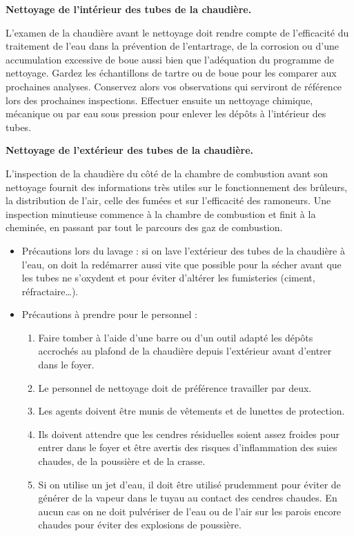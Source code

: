 \vspace{0.3cm}
\textbf{Nettoyage de l’intérieur des tubes de la chaudière.}
\vspace{0.3cm}

L’examen de la chaudière avant le nettoyage doit rendre compte de l’efficacité du traitement de l’eau dans la prévention de l’entartrage, de la corrosion ou d’une accumulation excessive de boue aussi bien que l’adéquation du programme de nettoyage. Gardez les échantillons de tartre ou de boue pour les comparer aux prochaines analyses. Conservez alors vos observations qui serviront de référence lors des prochaines inspections.
Effectuer ensuite un nettoyage chimique, mécanique ou par eau sous pression pour enlever les dépôts à l’intérieur des tubes.

\vspace{0.3cm}
\textbf{Nettoyage de l'extérieur des tubes de la chaudière.}
\vspace{0.3cm}

L’inspection de la chaudière du côté de la chambre de combustion avant son nettoyage fournit des informations très utiles sur le fonctionnement des brûleurs, la distribution de l’air, celle des fumées et sur l’efficacité des ramoneurs.
Une inspection minutieuse commence à la chambre de combustion et finit à la cheminée, en passant par tout le parcours des gaz de combustion.




\begin{itemize}
    \item Précautions lors du lavage : si on lave l’extérieur des tubes de la chaudière à l’eau, on doit la redémarrer aussi vite que possible pour la sécher avant que les tubes ne s’oxydent et pour éviter d’altérer les fumisteries (ciment, réfractaire…).
    \item Précautions à prendre pour le personnel : 
        \begin{enumerate}
            \item Faire tomber à l’aide d’une barre ou d’un outil adapté les dépôts accrochés au plafond de la chaudière depuis l’extérieur avant d’entrer dans le foyer.
            \item Le personnel de nettoyage doit de préférence travailler par deux.
            \item Les agents doivent être munis de vêtements et de lunettes de protection.
            \item Ils doivent attendre que les cendres résiduelles soient assez froides pour entrer dans le foyer et être avertis des risques d’inflammation des suies chaudes, de la poussière et de la crasse.
            \item Si on utilise un jet d’eau, il doit être utilisé prudemment pour éviter de générer de la vapeur dans le tuyau au contact des cendres chaudes. En aucun cas on ne doit pulvériser de l’eau ou de l’air sur les parois encore chaudes pour éviter des explosions de poussière.

        \end{enumerate}
\end{itemize} 

